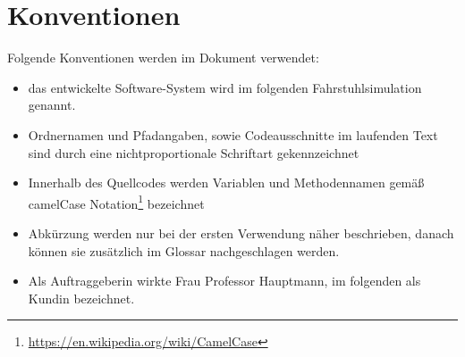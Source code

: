 \section*{Konventionen}
Folgende Konventionen werden im Dokument verwendet:\\
\begin{itemize}
	\item das entwickelte Software-System wird im folgenden Fahrstuhlsimulation genannt.
	\item Ordnernamen und Pfadangaben, sowie Codeausschnitte im laufenden Text sind durch eine nichtproportionale Schriftart gekennzeichnet
	\item Innerhalb des Quellcodes werden Variablen und Methodennamen gemäß camelCase Notation\footnote{\url{https://en.wikipedia.org/wiki/CamelCase}} bezeichnet
	\item Abkürzung werden nur bei der ersten Verwendung näher beschrieben, danach können sie zusätzlich im Glossar nachgeschlagen werden.
	\item Als Auftraggeberin wirkte Frau Professor Hauptmann, im folgenden als Kundin bezeichnet.
\end{itemize}
